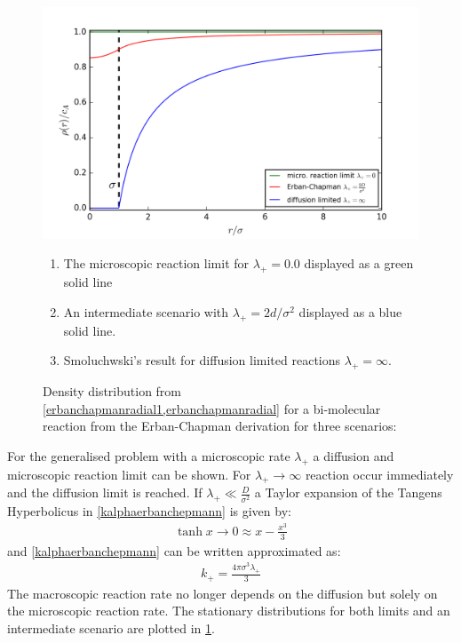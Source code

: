 \documentclass[
  a4paper,BCOR10mm,oneside,
  headsepline,footsepline,%
  fleqn,openbib
]{scrbook}
\begin{document}
\begin{figure}[h!]
\captionsetup{singlelinecheck=off}
\centering
\includegraphics[width=\textwidth]{./data/smoluchowskierban.png}
\caption{Density distribution from \cref{erbanchapmanradial1,erbanchapmanradial} for a bi-molecular reaction from the Erban-Chapman derivation for three scenarios:}
\begin{enumerate}
  \item The microscopic reaction limit for $\lambda_{+} =0.0$ displayed as a green solid line
  \item An intermediate scenario with $\lambda_{+} =2d/\sigma^2$ displayed as a blue solid line.
  \item Smoluchwski's result for diffusion limited reactions   $\lambda_{+}=\infty $.
\end{enumerate}
  \label{fig:diffusion_limit-Erban-Chapmann-figure}
\end{figure}
\par
For the generalised problem with a microscopic rate $\lambda_{+}$ a diffusion and microscopic reaction limit can be shown. For $\lambda_{+} \rightarrow \infty $ reaction occur immediately and the diffusion limit is reached. If  $\lambda_{+} \ll \frac{D}{\sigma^2}$ a Taylor expansion of the Tangens Hyperbolicus in \cref{kalphaerbanchepmann} is given by:
\begin{align}
\tanh{x\rightarrow 0} \approx x-\frac{x^3}{3}
\end{align}
and \cref{kalphaerbanchepmann} can be written approximated as:
\begin{align}
 k_{+}=\frac{4 \pi \sigma^3 \lambda_{+}}{3}
\end{align}
The macroscopic reaction rate no longer depends on the diffusion but solely on the microscopic reaction rate. The stationary distributions for both limits and an intermediate scenario are plotted in \cref{fig:diffusion_limit-Erban-Chapmann-figure}.\par
\end{document}
